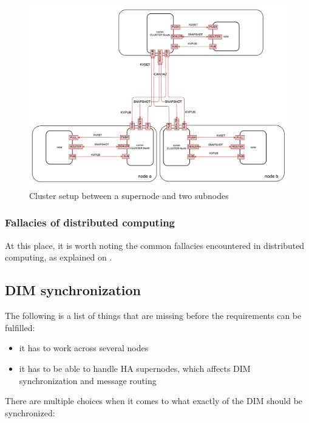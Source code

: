 \begin{figure}[]
	\includegraphics[width=\textwidth]{img/cluster_protocol.pdf}
	\caption{Cluster setup between a supernode and two subnodes}
	\label{fig:cluster}
\end{figure}

\subsubsection{Fallacies of distributed computing}
At this place, it is worth noting the common fallacies encountered in
distributed computing, as explained on \cite{dcomp:fallacies}.

\subsection{DIM synchronization}
The following is a list of things that are missing before the requirements can be fulfilled:
\begin{itemize}
\item it has to work across several nodes
\item it has to be able to handle HA supernodes, which affects DIM synchronization and message routing
\end{itemize}

There are multiple choices when it comes to what exactly of the DIM should be synchronized:

